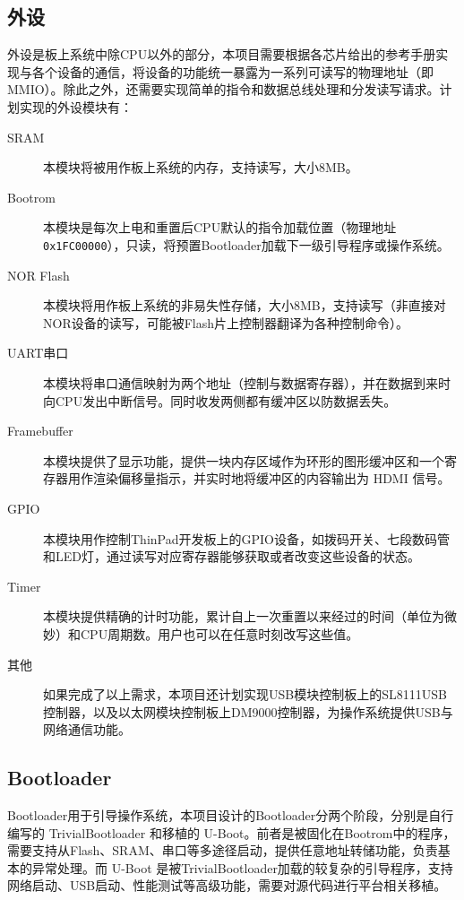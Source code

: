 \subsection{外设}

外设是板上系统中除CPU以外的部分，本项目需要根据各芯片给出的参考手册实现与各个设备的通信，将设备的功能统一暴露为一系列可读写的物理地址（即MMIO）。除此之外，还需要实现简单的指令和数据总线处理和分发读写请求。计划实现的外设模块有：

\begin{description}

    \item[SRAM] 本模块将被用作板上系统的内存，支持读写，大小8MB。
    \item[Bootrom] 本模块是每次上电和重置后CPU默认的指令加载位置（物理地址 \texttt{0x1FC00000}），只读，将预置Bootloader加载下一级引导程序或操作系统。
    \item[NOR Flash] 本模块将用作板上系统的非易失性存储，大小8MB，支持读写（非直接对NOR设备的读写，可能被Flash片上控制器翻译为各种控制命令）。
    \item[UART串口] 本模块将串口通信映射为两个地址（控制与数据寄存器），并在数据到来时向CPU发出中断信号。同时收发两侧都有缓冲区以防数据丢失。
    \item[Framebuffer] 本模块提供了显示功能，提供一块内存区域作为环形的图形缓冲区和一个寄存器用作渲染偏移量指示，并实时地将缓冲区的内容输出为 HDMI 信号。
    \item[GPIO] 本模块用作控制ThinPad开发板上的GPIO设备，如拨码开关、七段数码管和LED灯，通过读写对应寄存器能够获取或者改变这些设备的状态。
    \item[Timer] 本模块提供精确的计时功能，累计自上一次重置以来经过的时间（单位为微妙）和CPU周期数。用户也可以在任意时刻改写这些值。
    \item[其他] 如果完成了以上需求，本项目还计划实现USB模块控制板上的SL8111USB控制器，以及以太网模块控制板上DM9000控制器，为操作系统提供USB与网络通信功能。

\end{description}

\subsection{Bootloader}

Bootloader用于引导操作系统，本项目设计的Bootloader分两个阶段，分别是自行编写的 TrivialBootloader 和移植的 U-Boot。前者是被固化在Bootrom中的程序，需要支持从Flash、SRAM、串口等多途径启动，提供任意地址转储功能，负责基本的异常处理。而 U-Boot 是被TrivialBootloader加载的较复杂的引导程序，支持网络启动、USB启动、性能测试等高级功能，需要对源代码进行平台相关移植。

